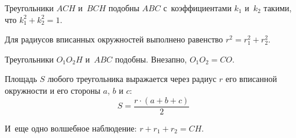 \begin{problems}

\item
Треугольники $ACH$ и~$BCH$ подобны $ABC$ с~коэффициентами $k_1$ и~$k_2$ такими,
что $k_1^2 + k_2^2 = 1$.

\item
Для радиусов вписанных окружностей выполнено равенство $r^2 = r_1^2 + r_2^2$.

\item
Треугольники $O_1 O_2 H$ и~$ABC$ подобны.
\qquad
\problem
Внезапно, $O_1 O_2 = C O$.

\end{problems}

\statement
Площадь $S$ любого треугольника выражается через радиус $r$ его вписанной
окружности и его стороны $a$, $b$ и $c$:
\[
    S = \frac{r \cdot (a + b + c)}{2}
\]

\begin{problems}

\item
И~еще одно волшебное наблюдение: $r + r_1 + r_2 = CH$.

\end{problems}


